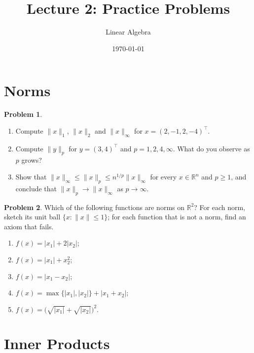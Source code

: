 \documentclass[11pt]{article}
\title{Lecture 2: Practice Problems}
\author{Linear Algebra}
\date{\today}
\theoremstyle{definition}
\newtheorem{problem}{Problem}[section]
\newcommand{\norm}[1]{\lVert #1 \rVert}
\begin{document}
\maketitle

\section{Norms}

\begin{problem}\label{pr:norms-compute}
    \begin{enumerate}[label=(\alph*)]
        \item Compute $\norm{x}_1$, $\norm{x}_2$ and $\norm{x}_\infty$ for $x = (2, -1, 2, -4)^\top$.
        \item Compute $\norm{y}_p$ for $y = (3, 4)^\top$ and $p = 1, 2, 4, \infty$. What do you observe as $p$ grows?
        \item Show that $\norm{x}_\infty \leq \norm{x}_p \leq n^{1/p} \norm{x}_\infty$ for every $x \in \mathbb{R}^n$ and $p \geq 1$, and conclude that $\norm{x}_p \to \norm{x}_\infty$ as $p \to \infty$.
    \end{enumerate}
\end{problem}

\begin{problem}\label{pr:which-norms}
    Which of the following functions are norms on $\mathbb{R}^2$? For each norm, sketch its unit ball $\{x : \norm{x} \leq 1\}$; for each function that is not a norm, find an axiom that fails.
    \begin{enumerate}[label=(\alph*)]
        \item $f(x) = |x_1| + 2|x_2|$;
        \item $f(x) = |x_1| + x_2^2$;
        \item $f(x) = |x_1 - x_2|$;
        \item $f(x) = \max\{|x_1|, |x_2|\} + |x_1 + x_2|$;
        \item $f(x) = \big(\sqrt{|x_1|} + \sqrt{|x_2|}\big)^2$.
    \end{enumerate}
\end{problem}

\section{Inner Products}
\end{document}
